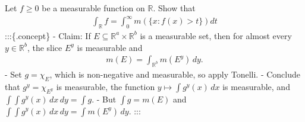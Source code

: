 Let \(f \geq 0\) be a measurable function on \({\mathbb{R}}\). Show that
\begin{align*}
\int _{{\mathbb{R}}} f = \int _{0}^{\infty} m(\{x: f(x)>t\}) dt
\end{align*}
:::\{.concept\} \envlist - Claim: If
\(E\subseteq {\mathbb{R}}^a \times{\mathbb{R}}^b\) is a measurable set,
then for almost every \(y\in {\mathbb{R}}^b\), the slice \(E^y\) is
measurable and
\begin{align*}
m(E) = \int_{{\mathbb{R}}^b} m(E^y) \,dy
.\end{align*}
- Set \(g = \chi_E\), which is non-negative and measurable, so apply
Tonelli. - Conclude that \(g^y = \chi_{E^y}\) is measurable, the
function \(y\mapsto \int g^y(x)\, dx\) is measurable, and
\(\int \int g^y(x)\,dx \,dy = \int g\). - But \(\int g = m(E)\) and
\(\int\int g^y(x) \,dx\,dy = \int m(E^y)\,dy\). :::

